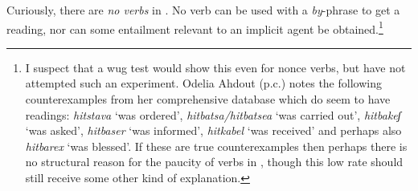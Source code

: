 \begin{exe}
\begin{xlist}
\begin{xlist}
\begin{exe}
\begin{xlist}
\begin{xlist}
\begin{exe}
\begin{xlist}
\begin{xlist}
\begin{exe}
\begin{exe}
\begin{xlist}
\begin{exe}
\begin{exe}
\begin{xlist}
\begin{exe}
\begin{exe}
\begin{exe}
\begin{exe}
\begin{exe}
\begin{xlist}
\begin{exe}
\begin{xlist}
\begin{exe}
\begin{exe}
\begin{xlist}
\begin{exe}
\begin{xlist}
\begin{exe}
\begin{xlist}
\begin{exe}
\begin{exe}
\begin{exe}
\begin{xlist}
\begin{exe}
\begin{exe}
\begin{exe}
\begin{xlist}
\begin{exe}
\begin{xlist}
\begin{exe}
\begin{xlist}
\begin{exe}
\begin{xlist}
\begin{exe}
\begin{exe}
\begin{exe}
\begin{exe}
\begin{xlist}
\begin{exe}
\begin{xlist}
\begin{exe}
\begin{xlist}
\begin{exe}
\begin{xlist}
\begin{exe}
\begin{xlist}
\begin{exe}
\begin{xlist}
\begin{exe}
\begin{exe}
\begin{exe}
\begin{exe}
\begin{xlist}
\begin{exe}
\begin{xlist}
\begin{exe}
\begin{xlist}
\begin{exe}
\begin{exe}
\begin{xlist}
\begin{exe}
\begin{xlist}
\begin{exe}
\begin{exe}
\begin{exe}
\begin{exe}
\begin{xlist}
\begin{xlist}
\begin{exe}
\begin{xlist}
\begin{exe}
Curiously, there are \textit{no  verbs} in {\thit}. No verb can be used with a \emph{by}-phrase to get a  reading, nor can some entailment relevant to an implicit agent be obtained.\footnote{I suspect that a wug test would show this even for nonce verbs, but have not attempted such an experiment. Odelia Ahdout (p.c.) notes the following counterexamples from her comprehensive database which do seem to have  readings: \emph{hitstava} `was ordered', \emph{hitbatsa/hitbatsea} `was carried out', \emph{hitbakeʃ} `was asked', \emph{hitbaser} `was informed', \emph{hitkabel} `was received' and perhaps also \emph{hitbarex} `was blessed'. If these are true counterexamples then perhaps there is no structural reason for the paucity of  verbs in {\thit}, though this low rate should still receive some other kind of explanation.}
 \begin{exe}
	
 \z 


\end{exe}
\end{exe}
\end{xlist}
\end{exe}
\end{xlist}
\end{xlist}
\end{exe}
\end{exe}
\end{exe}
\end{exe}
\end{xlist}
\end{exe}
\end{xlist}
\end{exe}
\end{exe}
\end{xlist}
\end{exe}
\end{xlist}
\end{exe}
\end{xlist}
\end{exe}
\end{exe}
\end{exe}
\end{exe}
\end{xlist}
\end{exe}
\end{xlist}
\end{exe}
\end{xlist}
\end{exe}
\end{xlist}
\end{exe}
\end{xlist}
\end{exe}
\end{xlist}
\end{exe}
\end{exe}
\end{exe}
\end{exe}
\end{xlist}
\end{exe}
\end{xlist}
\end{exe}
\end{xlist}
\end{exe}
\end{xlist}
\end{exe}
\end{exe}
\end{exe}
\end{xlist}
\end{exe}
\end{exe}
\end{exe}
\end{xlist}
\end{exe}
\end{xlist}
\end{exe}
\end{xlist}
\end{exe}
\end{exe}
\end{xlist}
\end{exe}
\end{xlist}
\end{exe}
\end{exe}
\end{exe}
\end{exe}
\end{exe}
\end{xlist}
\end{exe}
\end{exe}
\end{xlist}
\end{exe}
\end{exe}
\end{xlist}
\end{xlist}
\end{exe}
\end{xlist}
\end{xlist}
\end{exe}
\end{xlist}
\end{xlist}
\end{exe}
